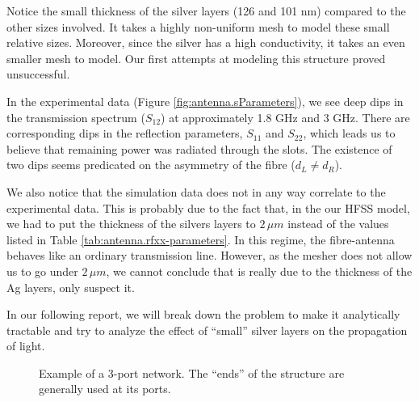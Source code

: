 Notice the small thickness
of the silver layers (126 and 101 nm) compared to the other 
sizes involved. It takes a highly non-uniform mesh to model
these small relative sizes. Moreover, since the silver has a high
conductivity, it takes an even smaller mesh to model. Our first 
attempts at modeling this structure proved unsuccessful.

In the experimental data (\see Figure \ref{fig:antenna.sParameters}), 
we see deep dips in the transmission spectrum ($S_{12}$) at approximately
1.8 GHz and 3 GHz. There are corresponding dips in the reflection parameters,
$S_{11}$ and $S_{22}$, which leads us to believe that remaining power 
was radiated through the slots. The existence of two dips seems predicated on the asymmetry
of the fibre ($d_L\neq d_R$). 

We also notice that the simulation data does not in any way correlate
to the experimental data. This is probably due to the fact that, in the our
HFSS model, we had to put the thickness of the silvers layers to $2\,\unit{\mu m}$
instead of the values listed in Table \ref{tab:antenna.rfxx-parameters}. In 
this regime, the fibre-antenna behaves like an ordinary transmission line. 
However, as the mesher does not allow us to go under $2\,\unit{\mu m}$, we cannot
conclude that is really due to the thickness of the Ag layers, only suspect it.

In our following report, we will break down the problem
to make it analytically tractable and try to analyze the effect of ``small''
silver layers on the propagation of light. 

\begin{figure}
 \begin{center}
 \end{center}
 \caption[Example of a 3-port network]{Example of a 3-port network. The ``ends'' of the structure are generally used at its ports.}
 \label{fig:antenna.network}
\end{figure}

